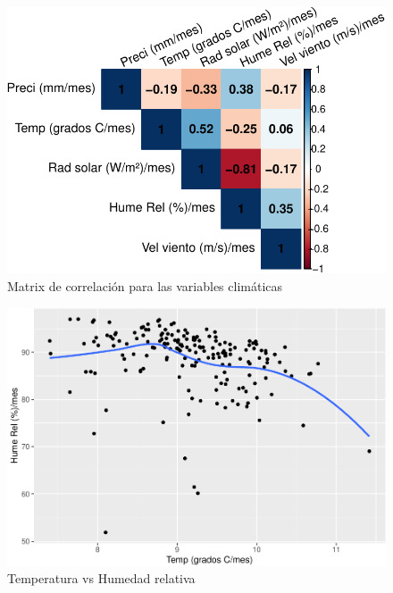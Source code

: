 \documentclass[conference,final,]{IEEEtran}
\makeatletter
\def\maxwidth{\ifdim\Gin@nat@width>\linewidth\linewidth
\else\Gin@nat@width\fi}
\let\Oldincludegraphics\includegraphics
\renewcommand{\includegraphics}[1]{\Oldincludegraphics[width=\maxwidth]{#1}}
\makeatother
\begin{document}
\begin{figure}
\centering
\includegraphics{Hidrology_files/figure-latex/unnamed-chunk-17-1.pdf}
\caption{Matrix de correlación para las variables climáticas}
\end{figure}

\begin{figure}
\centering
\includegraphics{Hidrology_files/figure-latex/unnamed-chunk-18-1.pdf}
\caption{Temperatura vs Humedad relativa}
\end{figure}
\end{document}
